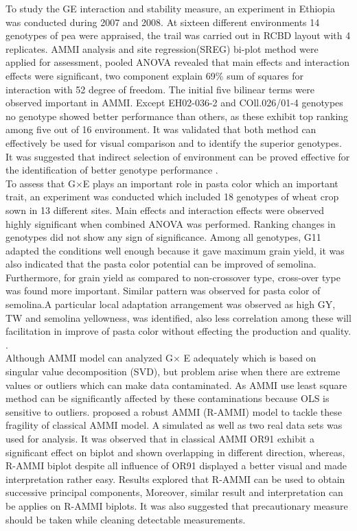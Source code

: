  To study the GE interaction and stability measure, an experiment in Ethiopia was conducted during  2007 and 2008.  At sixteen different environments 14 genotypes of pea were appraised, the trail was carried out in RCBD layout with 4 replicates. AMMI analysis and site regression(SREG) bi-plot method were applied for assessment, pooled ANOVA revealed that main effects and interaction effects were significant, two component explain 69\% sum of squares for interaction with 52 degree of freedom. The  initial  five bilinear terms were observed important in AMMI. Except EH02-036-2 and COll.026/01-4 genotypes no genotype showed better performance than others, as these exhibit top ranking among five out of 16 environment. It was validated that both method can effectively be used for visual comparison and to identify the superior genotypes. It was suggested that indirect selection of environment can be proved effective for the identification of better genotype performance \citep{Tolessa2013}.\\
 
 To assess that G$\times$E plays an important role in pasta color which an important trait, an experiment was conducted which included 18 genotypes of wheat crop sown in 13 different sites. Main effects and interaction effects were observed highly significant when combined ANOVA was performed. Ranking changes in genotypes did not show any sign of significance. Among all genotypes, G11 adapted the conditions well enough because it gave maximum grain yield, it was also indicated that the pasta color potential can be improved of semolina. Furthermore, for grain yield as compared to non-crossover type, cross-over type was found more important. Similar pattern was observed for pasta color of semolina.A particular local adaptation arrangement was observed as high GY, TW and semolina yellowness, was identified, also less correlation among these will facilitation in improve of pasta color without effecting the production and quality.  \citep{Schulthessa2013}. \\
 
 Although AMMI model can analyzed G$\times$ E adequately which is based on singular value decomposition (SVD), but problem arise when there are extreme values or outliers which can make data contaminated. As AMMI use least square method can be significantly affected by these contaminations because OLS is sensitive to outliers. \citep{Rodrigues2015} proposed a robust AMMI (R-AMMI) model to tackle these fragility of classical AMMI model. A simulated as well as two real data sets was used for analysis. It was observed that in classical AMMI OR91 exhibit a significant effect on biplot and shown overlapping in different direction, whereas, R-AMMI biplot despite all influence of OR91 displayed a better visual and made interpretation rather easy. Results explored that R-AMMI can be used to obtain successive principal components, Moreover, similar result and interpretation can be applies on R-AMMI biplots. It was also suggested that precautionary measure should be taken while cleaning detectable measurements.  \\
 
